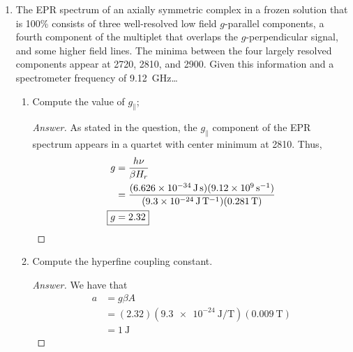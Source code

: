 \documentclass[../psets.tex]{subfiles}
\begin{document}
\begin{enumerate}
\begin{proof}[Answer]
        Since the $d^9$ (one electron unpaired) ion is in solution (not frozen), the $g$-values will be isotropic. Additionally, $I=3/2$ and the relevant selection rules ($\Delta M_S=\pm 1$ and $\Delta M_I=0$) means that the hyperfine splitting splits the peak into a quartet of peaks with the same height. Thus, the EPR spectrum should resemble the following.
        \begin{center}
            \texttt{[image: PSet2-EPR.jpg]}
        \end{center}
    \end{proof}
    \item The EPR spectrum of an axially symmetric  complex in a frozen solution that is 100\%  consists of three well-resolved low field $g$-parallel components, a fourth component of the multiplet that overlaps the $g$-perpendicular signal, and some higher field lines. The minima between the four largely resolved components appear at \SI{2720}{\gauss}, \SI{2810}{\gauss}, and \SI{2900}{\gauss}. Given this information and a spectrometer frequency of \SI{9.12}{\giga\hertz}\dots
    \begin{enumerate}
        \item Compute the value of $g_\parallel$;
        \begin{proof}[Answer]
            As stated in the question, the $g_\parallel$ component of the EPR spectrum appears in a quartet with center minimum at \SI{2810}{\gauss}. Thus,
            \begin{align*}
                g &= \frac{h\nu}{\beta H_r}\\
                &= \frac{(\SI{6.626e-34}{\joule\second})(\SI{9.12e9}{\per\second})}{(\SI{9.3e-24}{\joule\per\tesla})(\SI{0.281}{\tesla})}\\
                \Aboxed{g &= 2.32}
            \end{align*}
        \end{proof}
        \item Compute the hyperfine coupling constant.
        \begin{proof}[Answer]
            We have that
            \begin{align*}
                a &= g\beta A\\
                &= (2.32)(\SI{9.3e-24}{\joule\per\tesla})(\SI{0.009}{\tesla})\\
                &= \SI{1}{\joule}
            \end{align*}
        \end{proof}

\end{enumerate}
\end{enumerate}
\end{document}

